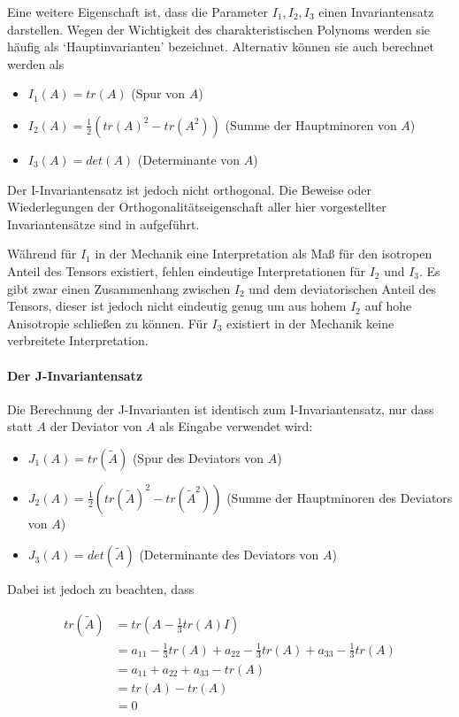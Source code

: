 \documentclass[a4paper,fontsize=12pt,toc=bib,halfparskip]{scrartcl}
\begin{document}
Eine weitere Eigenschaft ist, dass die Parameter $I_1, I_2, I_3$ einen Invariantensatz darstellen. Wegen der Wichtigkeit des charakteristischen Polynoms werden sie h\"aufig als `Hauptinvarianten' bezeichnet. Alternativ k\"onnen sie auch berechnet werden als

\begin{itemize}
	\item $I_1(A) = tr(A)$ (Spur von $A$)
	\item $I_2(A) = \frac{1}{2}(tr(A)^2 - tr(A^2))$ (Summe der Hauptminoren von $A$)
	\item $I_3(A) = det(A)$ (Determinante von $A$)
\end{itemize}

Der I-Invariantensatz ist jedoch nicht orthogonal. Die Beweise oder Wiederlegungen der Orthogonalit\"atseigenschaft aller hier vorgestellter Invariantens\"atze sind in \cite[S.~144]{ennis2006orthogonal} aufgef\"uhrt.

W\"ahrend f\"ur $I_1$ in der Mechanik eine Interpretation als Ma{\ss} f\"ur den isotropen Anteil des Tensors existiert, fehlen eindeutige Interpretationen f\"ur $I_2$ und $I_3$. Es gibt zwar einen Zusammenhang zwischen $I_2$ und dem deviatorischen Anteil des Tensors, dieser ist jedoch nicht eindeutig genug um aus hohem $I_2$ auf hohe Anisotropie schlie{\ss}en zu k\"onnen. F\"ur $I_3$ existiert in der Mechanik keine verbreitete Interpretation. 

\paragraph{Der J-Invariantensatz}
 Die Berechnung der J-Invarianten ist identisch zum I-Invariantensatz, nur dass statt $A$ der Deviator von $A$ als Eingabe verwendet wird:

\begin{itemize}
	\item $J_1(A) = tr(\tilde{A})$ (Spur des Deviators von $A$)
	\item $J_2(A) = \frac{1}{2}(tr(\tilde{A})^2 - tr(\tilde{A}^2))$ (Summe der Hauptminoren des Deviators von $A$)
\item $J_3(A) = det(\tilde{A})$ (Determinante des Deviators von $A$)
\end{itemize}

Dabei ist jedoch zu beachten, dass

\begin{equation}
	\begin{split}
	tr(\tilde{A}) &= tr(A - \frac{1}{3}tr(A)I)\\
	&= a_{11} - \frac{1}{3} tr(A) + a_{22} - \frac{1}{3} tr(A) + a_{33} - \frac{1}{3} tr(A)\\
	&= a_{11} + a_{22} + a_{33} - tr(A)\\
	&= tr(A) - tr(A)\\
	&= 0
	\end{split}
\end{equation}
\end{document}
